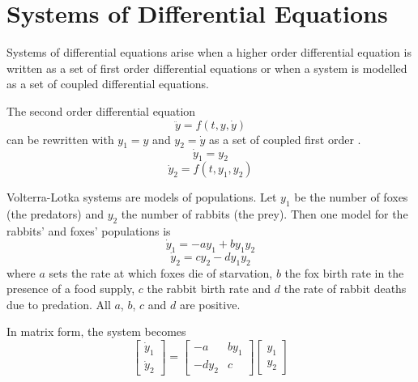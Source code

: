 %
%
%
%
%

\chapter{Systems of Differential Equations}
\label{sde chp}


Systems of differential equations arise when a higher order differential
equation is written as a set of first order differential equations or when a
system is modelled as a set of coupled differential equations.

\begin{example}
The second order differential equation 
$$\ddot{y}=f(t,y,\dot{y})$$
can be rewritten with $y_1=y$ and $y_2=\dot{y}$ as a set of coupled first
order \ODEs.
$$\dot{y}_1=y_2$$
$$\dot{y}_2=f(t,y_1,y_2)$$
\end{example}

\begin{example}
Volterra-Lotka systems are models of populations.  Let $y_1$ be the number
of foxes (the predators) and $y_2$ the number of rabbits (the prey).  Then
one model for the rabbits' and foxes' populations is
$$\dot{y}_1=-ay_1+by_1y_2$$
$$\dot{y}_2=cy_2-dy_1y_2$$
where $a$ sets the rate at which foxes die of starvation, $b$ the fox birth 
rate in the presence of a food supply, $c$ the rabbit birth rate and $d$ the
rate of rabbit deaths due to predation.  All $a$, $b$, $c$ and $d$ are
positive.

In matrix form, the system becomes
$$\begin{bmatrix}\dot{y}_1 \\\dot{y}_2\end{bmatrix}=
\begin{bmatrix}-a & by_1 \\ -dy_2 & c \end{bmatrix}
\begin{bmatrix}y_1 \\y_2\end{bmatrix}$$
\end{example}


